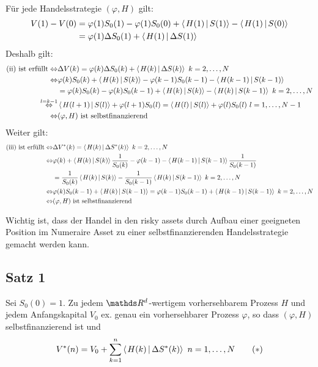 \\
Für jede Handelsstrategie $(\varphi,H)$ gilt:
\begin{equation*}
\begin{aligned}
	V(1)-V(0) &= \varphi(1)S_0(1)-\varphi(1)S_0(0)+\sprod{H(1)}{S(1)}-\sprod{H(1)}{S(0)}\\
	&= \varphi(1)\Delta S_0(1)+\sprod{H(1)}{\Delta S(1)}
\end{aligned}
\end{equation*}
Deshalb gilt: 
\begin{equation*}
\begin{aligned}
	\text{(ii) ist erfüllt} \Leftrightarrow &\Delta V(k)=\varphi(k)\Delta S_0(k)+\sprod{H(k)}{\Delta S(k)}~k=2,\dots,N\\
	\Leftrightarrow &\varphi(k)S_0(k)+\sprod{H(k)}{S(k)}- \varphi(k-1)S_0(k-1)-\sprod{H(k-1)}{S(k-1)}\\
	&=\varphi(k)S_0(k)-\varphi(k)S_0(k-1)+\sprod{H(k)}{S(k)}-\sprod{H(k)}{S(k-1)}~k=2,\dots,N\\
	\stackrel{l=k-1}{\Leftrightarrow} &\sprod{H(l+1)}{S(l)}+\varphi(l+1)S_0(l)=\sprod{H(l)}{S(l)}+\varphi(l)S_0(l)~l=1,\dots,N-1\\
	\Leftrightarrow &(\varphi,H) \text{ ist selbstfinanzierend}
\end{aligned}
\end{equation*}
Weiter gilt:
\begin{equation*}
\begin{aligned}
	\text{(iii) ist erfüllt} \Leftrightarrow &\Delta V^*(k)=\sprod{H(k)}{\Delta S^*(k)}~ k=2,\dots,N\\
	\Leftrightarrow &\varphi(k)+\sprod{H(k)}{S(k)}\frac{1}{S_0(k)}-\varphi(k-1)-\sprod{H(k-1)}{S(k-1)}\frac{1}{S_0(k-1)}\\
	&=\frac{1}{S_0(k)}\sprod{H(k)}{S(k)}-\frac{1}{S_0(k-1)}\sprod{H(k)}{S(k-1)}~ k=2,\dots,N\\
	\Leftrightarrow &\varphi(k)S_0(k-1)+\sprod{H(k)}{S(k-1)}= \varphi(k-1)S_0(k-1)+\sprod{H(k-1)}{S(k-1)}~ k=2,\dots,N\\
	\Leftrightarrow &(\varphi,H) \text{ ist selbstfinanzierend}
\end{aligned}
\end{equation*}

Wichtig ist, dass der Handel in den risky assets durch Aufbau einer geeigneten Position im Numeraire Asset zu einer selbstfinanzierenden Handelsstrategie gemacht werden kann.

\subsection{Satz 1}
\label{sub:satz_1}
Sei $S_0(0)=1$. Zu jedem $\R^d$-wertigem vorhersehbarem Prozess $H$ und jedem Anfangskapital $V_0$ ex. genau ein vorhersehbarer Prozess $\varphi$, so dass $(\varphi,H)$ selbstfinanzierend ist und 
\[
V^*(n)= V_0+\sum_{k=1}^{n}\sprod{H(k)}{\Delta S^*(k)}~n=1,\dots,N \tag*{$(\ast)$}
\]

